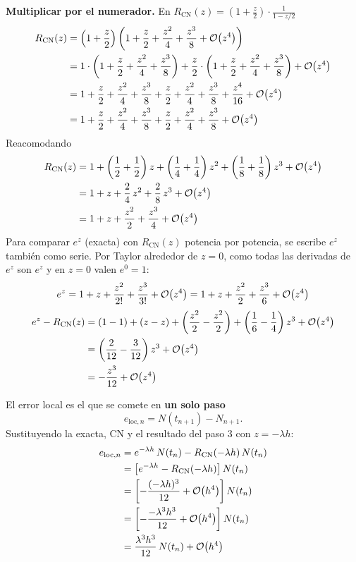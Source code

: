 \textbf{Multiplicar por el numerador.} En $R_{\mathrm{CN}}(z) = \left(1 + \frac{z}{2}\right)\cdot\frac{1}{1 - z/2}$
\begin{align*}
	R_{\mathrm{CN}}(z) &= \left(1 + \frac{z}{2}\right)\left(1 + \frac{z}{2} + \frac{z^2}{4} + \frac{z^3}{8} + \mathcal{O}\!\left(z^4\right)\right)\\
	&= 1\cdot\left(1 + \frac{z}{2} + \frac{z^2}{4} + \frac{z^3}{8}\right)
	+ \frac{z}{2}\cdot\left(1 + \frac{z}{2} + \frac{z^2}{4} + \frac{z^3}{8}\right) + \mathcal{O}\!\left(z^4\right)\\
	&= 1 + \frac{z}{2} + \frac{z^2}{4} + \frac{z^3}{8}
	+ \frac{z}{2} + \frac{z^2}{4} + \frac{z^3}{8} + \frac{z^4}{16} + \mathcal{O}\!\left(z^4\right)\\
	&= 1 + \frac{z}{2} + \frac{z^2}{4} + \frac{z^3}{8}
	+ \frac{z}{2} + \frac{z^2}{4} + \frac{z^3}{8} + \mathcal{O}\!\left(z^4\right)
\end{align*}
Reacomodando
\begin{align*}
	R_{\mathrm{CN}}(z) &= 1 + \left(\frac12 + \frac12\right) z + \left(\frac14 + \frac14\right) z^2 + \left(\frac18 + \frac18\right) z^3 + \mathcal{O}\!\left(z^4\right)\\
	&= 1 + z + \frac{2}{4}\,z^2 + \frac{2}{8}\,z^3 + \mathcal{O}\!\left(z^4\right)\\
	&= 1 + z + \frac{z^2}{2} + \frac{z^3}{4} + \mathcal{O}\!\left(z^4\right)
\end{align*}
Para comparar $e^{z}$ (exacta) con $R_{\mathrm{CN}}(z)$ potencia por potencia, se escribe $e^{z}$ también como serie.
Por Taylor alrededor de $z = 0$, como todas las derivadas de $e^{z}$ son $e^{z}$ y en $z = 0$ valen $e^{0} = 1$:
\[
e^{z} = 1 + z + \frac{z^2}{2!} + \frac{z^3}{3!} + \mathcal{O}\!\left(z^4\right) = 1 + z + \frac{z^2}{2} + \frac{z^3}{6} + \mathcal{O}\!\left(z^4\right)
\]
\begin{align*}
	e^{z} - R_{\mathrm{CN}}(z) &= \left(1 - 1\right) + \left(z - z\right) + \left(\frac{z^2}{2} - \frac{z^2}{2}\right)
	+ \left(\frac16 - \frac14\right) z^3 + \mathcal{O}\!\left(z^4\right)\\
	&= \left(\frac{2}{12} - \frac{3}{12}\right) z^3 + \mathcal{O}\!\left(z^4\right)\\
	&= -\frac{z^3}{12} + \mathcal{O}\!\left(z^4\right)
\end{align*}


El error local es el que se comete en \textbf{un solo paso}
\[
e_{\mathrm{loc},n} = N(t_{n+1}) - N_{n+1}.
\]
Sustituyendo la exacta, CN y el resultado del paso 3 con $z = -\lambda h$:
\begin{align*}
	e_{\mathrm{loc},n} &= e^{-\lambda h}\,N(t_n) - R_{\mathrm{CN}}(-\lambda h)\,N(t_n)\\
	&= \left[e^{-\lambda h} - R_{\mathrm{CN}}(-\lambda h)\right] N(t_n)\\
	&= \left[-\frac{(-\lambda h)^3}{12} + \mathcal{O}\!\left(h^4\right)\right] N(t_n)\\
	&= \left[-\frac{-\lambda^3 h^3}{12} + \mathcal{O}\!\left(h^4\right)\right] N(t_n)\\
	&= \frac{\lambda^3 h^3}{12}\,N(t_n) + \mathcal{O}\!\left(h^4\right)
\end{align*}

